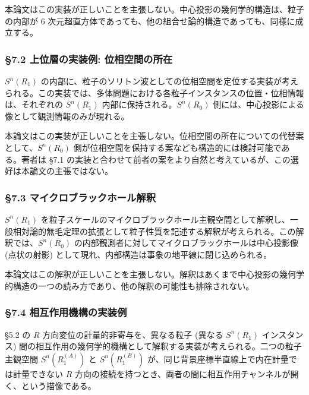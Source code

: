 \documentclass[
  a4paper,11pt]{ltjsarticle}
\begin{document}
本論文はこの実装が正しいことを主張しない。中心投影の幾何学的構造は、粒子の内部が
6 次元超直方体であっても、他の組合せ論的構造であっても、同様に成立する。

\subsubsection{§7.2 上位層の実装例:
位相空間の所在}\label{ux4e0aux4f4dux5c64ux306eux5b9fux88c5ux4f8b-ux4f4dux76f8ux7a7aux9593ux306eux6240ux5728}

\(S^n(R_1)\)
の内部に、粒子のソリトン波としての位相空間を定位する実装が考えられる。この実装では、多体問題における各粒子インスタンスの位置・位相情報は、それぞれの
\(S^n(R_1)\) 内部に保持される。\(S^n(R_0)\)
側には、中心投影による像として観測情報のみが現れる。

本論文はこの実装が正しいことを主張しない。位相空間の所在についての代替案として、\(S^n(R_0)\)
側が位相空間を保持する案なども構造的には検討可能である。著者は §7.1
の実装と合わせて前者の案をより自然と考えているが、この選好は本論文の主張ではない。

\subsubsection{§7.3
マイクロブラックホール解釈}\label{ux30deux30a4ux30afux30edux30d6ux30e9ux30c3ux30afux30dbux30fcux30ebux89e3ux91c8}

\(S^n(R_1)\)
を粒子スケールのマイクロブラックホール主観空間として解釈し、一般相対論的無毛定理の拡張として粒子性質を記述する解釈が考えられる。この解釈では、\(S^n(R_0)\)
の内部観測者に対してマイクロブラックホールは中心投影像 (点状の射影)
として現れ、内部構造は事象の地平線に閉じ込められる。

本論文はこの解釈が正しいことを主張しない。解釈はあくまで中心投影の幾何学的構造の一つの読み方であり、他の解釈の可能性も排除されない。

\subsubsection{§7.4
相互作用機構の実装例}\label{ux76f8ux4e92ux4f5cux7528ux6a5fux69cbux306eux5b9fux88c5ux4f8b}

§5.2 の \(R\) 方向変位の計量的非寄与を、異なる粒子 (異なる \(S^n(R_1)\)
インスタンス)
間の相互作用の幾何学的機構として解釈する実装が考えられる。二つの粒子主観空間
\(S^n(R_1^{(A)})\) と \(S^n(R_1^{(B)})\)
が、同じ背景座標半直線上で内在計量では計量できない \(R\)
方向の接続を持つとき、両者の間に相互作用チャンネルが開く、という描像である。
\end{document}
